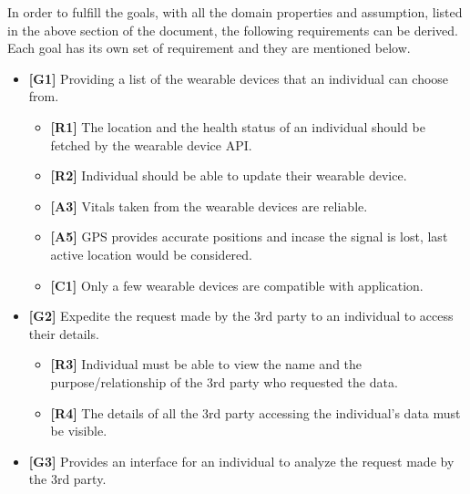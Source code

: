 In order to fulfill the goals, with all the domain properties and assumption, listed in the above section of the document, the following requirements can be derived. Each goal has its own set of requirement and they are mentioned below.\newline

\begin{itemize}

\item\textbf{[G1]} Providing a list of the wearable devices that an individual can choose from.

\begin{itemize}
\item\textbf{[R1]} The location and the health status of an individual should be fetched by the wearable device API.
\item\textbf{[R2]} Individual should be able to update their wearable device.
\item\textbf{[A3]} Vitals taken from the wearable devices are reliable.
\item\textbf{[A5]} GPS provides accurate positions and incase the signal is lost, last active location would be considered.
\item\textbf{[C1]} Only a few wearable devices are compatible with application.\newline
\end{itemize}

\item\textbf{[G2]} Expedite the request made by the 3rd party to an individual to access their details.

\begin{itemize}
\item\textbf{[R3]} Individual must be able to view the name and the purpose/relationship of the 3rd party who requested the data.
\item\textbf{[R4]} The details of all the 3rd party accessing the individual’s data must be visible.\newline
\end{itemize}

\item\textbf{[G3]} Provides an interface for an individual to analyze the request made by the 3rd party.


\end{itemize}
